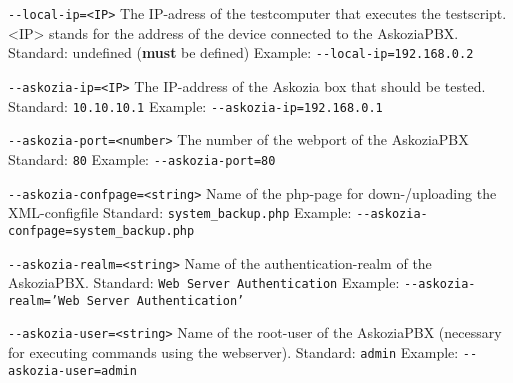 \begin{description}
\item {\texttt{-{}-local-ip=<IP>}} \newline
The IP-adress of the testcomputer that executes the testscript.
<IP> stands for the address of the device connected to the AskoziaPBX.
\newline Standard: undefined (\textbf{must} be defined)
\newline Example: \texttt{-{}-local-ip=192.168.0.2}

\item {\texttt{-{}-askozia-ip=<IP>}} \newline
The IP-address of the Askozia box that should be tested.
\newline Standard: \texttt{10.10.10.1}
\newline Example: \texttt{-{}-askozia-ip=192.168.0.1}

\item {\texttt{-{}-askozia-port=<number>}} \newline
The number of the webport of the AskoziaPBX
\newline Standard: \texttt{80}
\newline Example: \texttt{-{}-askozia-port=80}

\item {\texttt{-{}-askozia-confpage=<string>}} \newline
Name of the php-page for down-/uploading the XML-configfile
\newline Standard: \texttt{system\_backup.php}
\newline Example: \texttt{-{}-askozia-confpage=system\_backup.php}

\item {\texttt{-{}-askozia-realm=<string>}} \newline
Name of the authentication-realm of the AskoziaPBX.
\newline Standard: \texttt{Web Server Authentication}
\newline Example: \texttt{-{}-askozia-realm='Web Server Authentication'}

\item {\texttt{-{}-askozia-user=<string>}} \newline
Name of the root-user of the AskoziaPBX
(necessary for executing commands using the webserver).
\newline Standard: \texttt{admin}
\newline Example: \texttt{-{}-askozia-user=admin}


\end{description}
